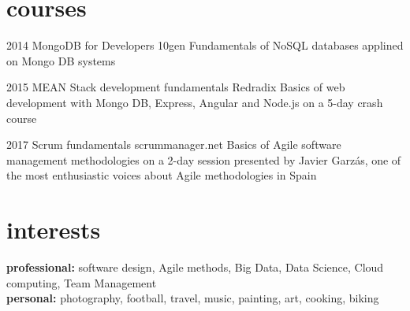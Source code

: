 \documentclass[]{friggeri-cv}
\begin{document}

\section{courses}

\begin{entrylist}

\entry
{2014}
{MongoDB for Developers}
{10gen}
{Fundamentals of NoSQL databases applined on Mongo DB systems}


\entry
{2015}
{MEAN Stack development fundamentals}
{Redradix}
{Basics of web development with Mongo DB, Express, Angular and Node.js on a 5-day crash course}


\entry
{2017}
{Scrum fundamentals}
{scrummanager.net}
{Basics of Agile software management methodologies on a 2-day session presented by Javier Garzás, one of the most enthusiastic voices about Agile methodologies in Spain}

\end{entrylist}


\section{interests}

\textbf{\headingfont professional:} software design, Agile methods, Big Data, Data Science, Cloud computing, Team Management \\ 
\textbf{\headingfont personal:} photography, football, travel, music, painting, art, cooking, biking



\end{document}
